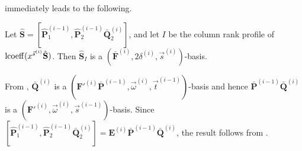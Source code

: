  immediately leads
to the following. 
\begin{lem}
\label{lem:computationAtTopLevel}Let $\hat{\mathbf{S}}=[\hat{\mathbf{P}}_{1}^{\left(i-1\right)},\hat{\mathbf{P}}_{2}^{\left(i-1\right)}\bar{\mathbf{Q}}_{2}^{\left(i\right)}]$,
and let $I$ be the column rank profile of $\operatorname{lcoeff}(x^{\vec{s}^{\left(i\right)}}\hat{\mathbf{S}})$.
Then $\hat{\mathbf{S}}_{I}$ is a $(\bar{\mathbf{F}}^{\left(i\right)},2\delta^{\left(i\right)},\vec{s}^{\left(i\right)})$-basis.\end{lem}
\begin{pf}
From , $\bar{\mathbf{Q}}^{\left(i\right)}$
is a $(\mathbf{F}'^{\left(i\right)}\bar{\mathbf{P}}^{\left(i-1\right)},\vec{\omega}^{\left(i\right)},\vec{t}^{\left(i-1\right)})$-basis
and hence $\bar{\mathbf{P}}^{\left(i-1\right)}\bar{\mathbf{Q}}^{\left(i\right)}$
is a $(\mathbf{F}'^{\left(i\right)},\vec{\omega}^{\left(i\right)},\vec{s}^{\left(i-1\right)})$-basis.
Since $[\hat{\mathbf{P}}_{1}^{\left(i-1\right)},\hat{\mathbf{P}}_{2}^{\left(i-1\right)}\bar{\mathbf{Q}}_{2}^{\left(i\right)}]=\mathbf{E}^{\left(i\right)}\bar{\mathbf{P}}^{\left(i-1\right)}\bar{\mathbf{Q}}^{\left(i\right)}$,
the result follows from . 
%
\begin{comment}
$=\mathbf{E}^{\left(i\right)}[\bar{\mathbf{P}}_{1}^{\left(i-1\right)},\bar{\mathbf{P}}_{2}^{\left(i-1\right)}\bar{\mathbf{Q}}_{2}^{\left(i\right)}]$ 
\end{comment}
{}\end{pf}

